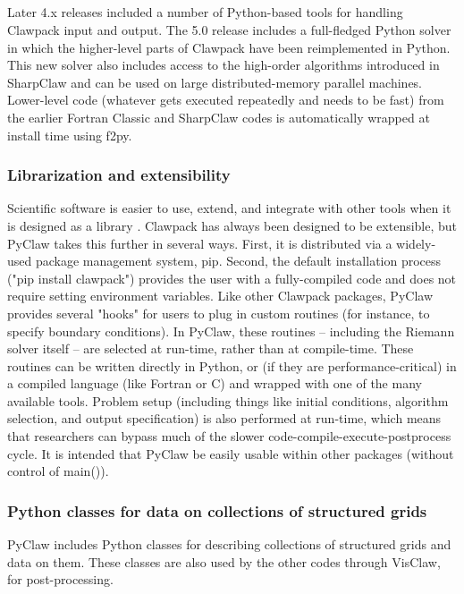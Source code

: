 %
%
%

\subsection{\pyclaw}

Later 4.x releases included a number of Python-based tools for handling
Clawpack input and output.  The 5.0 release includes a full-fledged Python
solver in which the higher-level parts of Clawpack have been reimplemented in
Python.  This new solver also includes access to the high-order algorithms
introduced in SharpClaw and can be used on large distributed-memory parallel
machines.  Lower-level code (whatever gets executed repeatedly and needs to be
fast) from the earlier Fortran Classic and SharpClaw codes is automatically
wrapped at install time using f2py.

\subsubsection{Librarization and extensibility}
Scientific software is easier to use, extend, and integrate with other tools when
it is designed as a library \cite{brown2014run}.  Clawpack has always been designed
to be extensible, but PyClaw takes this further in several ways.  First, it is
distributed via a widely-used package management system, pip.
Second, the default installation process ("pip install clawpack")
provides the user with a fully-compiled code and does not require setting environment
variables.  Like other Clawpack packages, PyClaw provides several "hooks" for users
to plug in custom routines (for instance, to specify boundary conditions).
In PyClaw, these routines -- including the Riemann solver itself -- are selected at
run-time, rather than at compile-time.  These routines can be written directly in
Python, or (if they are performance-critical) in a compiled language (like Fortran or C)
and wrapped with one of the many available tools.  Problem setup (including things like
initial conditions, algorithm selection, and output specification) is also
performed at run-time, which means that researchers can bypass much of the slower
code-compile-execute-postprocess cycle.
It is intended that PyClaw be easily usable within other packages (without control of main()).

\subsubsection{Python classes for data on collections of structured grids}
PyClaw includes Python classes for describing collections of structured grids
and data on them.
These classes are also used by the other codes through VisClaw, for post-processing.

